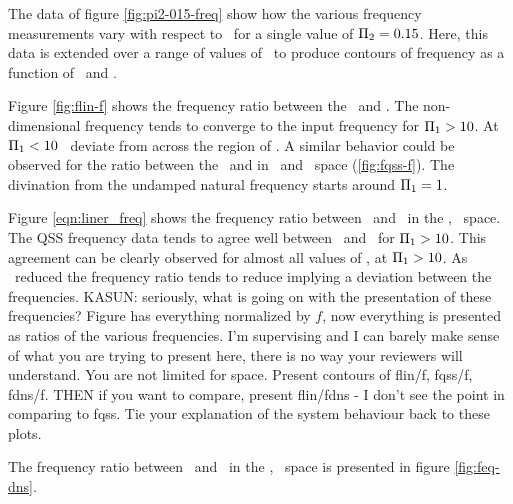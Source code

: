 The data of figure \ref{fig:pi2-015-freq} show how the various frequency measurements vary with respect to \massstiff\ for a single value of $\Pi_2 = 0.15$. Here, this data is extended over a range of values of \massdamp\ to produce contours of frequency as a function of \massstiff\ and \massdamp.








Figure \ref{fig:flin-f} shows the frequency ratio between the \freqlin\ and \freqinput. The non-dimensional frequency \freqlin tends to converge to the input frequency for $\Pi_1>10$. At $\Pi_1<10$ \freqlin\ deviate from \freqinput across the region of \massdamp. A similar behavior could be observed for the ratio between the \freqqss\ and \freqinput in \massstiff\ and \massdamp\ space (\ref{fig:fqss-f}). The divination from the undamped natural frequency starts around $\Pi_1=1$.  




Figure \ref{eqn:liner_freq} shows the frequency ratio between \freqlin\ and \freqqss\ in the \massstiff, \massdamp\ space. The QSS frequency data tends to agree well between \freqlin\ and \freqqss\ for $\Pi_1>10$. This agreement can be clearly observed for almost all values of \massdamp, at $\Pi_1>10$. As \massstiff\ reduced the frequency ratio tends to reduce implying a deviation between the frequencies.  KASUN: seriously, what is going on with the presentation of these frequencies? Figure has everything normalized by $f$, now everything is presented as ratios of the various frequencies. I'm supervising and I can barely make sense of what you are trying to present here, there is no way your reviewers will understand. You are not limited for space. Present contours of flin/f, fqss/f, fdns/f. THEN  if you want to compare, present flin/fdns - I don't see the point in comparing to fqss. Tie your explanation of the system behaviour back to these plots.



The frequency ratio between \freqlin\ and \freqdns\ in the \massstiff, \massdamp\ space is presented in figure \ref{fig:feq-dns}. 



